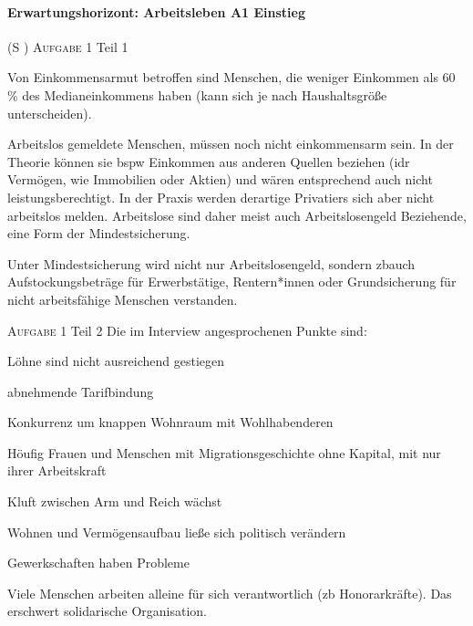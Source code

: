 \paragraph{Erwartungshorizont: Arbeitsleben A1 Einstieg} (\gls{S} \pageref{ARBEITSLEBEN-A1})
\textsc{Aufgabe 1} Teil 1 \quad
\begin{myitemize}
    \item Von Einkommensarmut betroffen sind Menschen, die weniger Einkommen als 60\,\% des Medianeinkommens haben (kann sich je nach Haushaltsgröße unterscheiden). 
    \item Arbeitslos gemeldete Menschen, müssen noch nicht einkommensarm sein. In der Theorie können sie \gls{bspw} Einkommen aus anderen Quellen beziehen (\gls{idr} Vermögen, wie Immobilien oder Aktien) und wären entsprechend auch nicht leistungsberechtigt. In der Praxis werden derartige Privatiers sich aber nicht arbeitslos melden. Arbeitslose sind daher meist auch Arbeitslosengeld Beziehende, eine Form der Mindestsicherung. 
    \item Unter Mindestsicherung wird nicht nur Arbeitslosengeld, sondern \gls{zb}auch Aufstockungsbeträge für Erwerbstätige, Rentern*innen oder Grundsicherung für nicht arbeitsfähige Menschen verstanden. 
\end{myitemize}

\textsc{Aufgabe 1} Teil 2 \quad
Die im Interview angesprochenen Punkte sind:
\begin{myitemize}
    \item Löhne sind nicht ausreichend gestiegen
    \item abnehmende Tarifbindung
    \item Konkurrenz um knappen Wohnraum mit Wohlhabenderen
    \item Höufig Frauen und Menschen mit Migrationsgeschichte ohne Kapital, mit nur ihrer Arbeitskraft
    \item Kluft zwischen Arm und Reich wächst
    \item Wohnen und Vermögensaufbau ließe sich politisch verändern
    \item Gewerkschaften haben Probleme
    \item Viele Menschen arbeiten alleine für sich verantwortlich (\gls{zb} Honorarkräfte). Das erschwert solidarische Organisation.
\end{myitemize}

